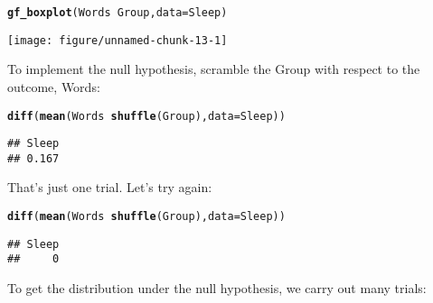 \documentclass[11pt]{article}\usepackage[]{graphicx}\usepackage[]{color}
\makeatletter
\def\maxwidth{ %
  \ifdim\Gin@nat@width>\linewidth
    \linewidth
  \else
    \Gin@nat@width
  \fi
}
\newcommand{\hlopt}[1]{\textcolor[rgb]{0,0,0}{#1}}%
\newcommand{\hlstd}[1]{\textcolor[rgb]{0.345,0.345,0.345}{#1}}%
\newcommand{\hlkwc}[1]{\textcolor[rgb]{0.333,0.667,0.333}{#1}}%
\newcommand{\hlkwd}[1]{\textcolor[rgb]{0.737,0.353,0.396}{\textbf{#1}}}%
\newenvironment{kframe}{%
 \def\at@end@of@kframe{}%
 \ifinner\ifhmode%
  \def\at@end@of@kframe{\end{minipage}}%
  \begin{minipage}{\columnwidth}%
 \fi\fi%
 \def\FrameCommand##1{\hskip\@totalleftmargin \hskip-\fboxsep
 \colorbox{shadecolor}{##1}\hskip-\fboxsep
     \hskip-\linewidth \hskip-\@totalleftmargin \hskip\columnwidth}%
 \MakeFramed {\advance\hsize-\width
   \@totalleftmargin\z@ \linewidth\hsize
   \@setminipage}}%
 {\par\unskip\endMakeFramed%
 \at@end@of@kframe}
\newenvironment{knitrout}{}{} %
\makeatother
\begin{document}
\begin{knitrout}
\color{fgcolor}\begin{kframe}
\begin{alltt}
\hlkwd{gf_boxplot}\hlstd{(Words} \hlopt{~} \hlstd{Group,} \hlkwc{data} \hlstd{= Sleep)}
\end{alltt}
\end{kframe}

{\centering \texttt{[image: figure/unnamed-chunk-13-1]} 

}



\end{knitrout}

To implement the null hypothesis, scramble the Group with respect to the
outcome, Words:
\begin{knitrout}
\color{fgcolor}\begin{kframe}
\begin{alltt}
\hlkwd{diff}\hlstd{(}\hlkwd{mean}\hlstd{(Words} \hlopt{~} \hlkwd{shuffle}\hlstd{(Group),} \hlkwc{data} \hlstd{= Sleep))}
\end{alltt}
\begin{verbatim}
## Sleep 
## 0.167
\end{verbatim}
\end{kframe}
\end{knitrout}

That's just one trial.  Let's try again:
\begin{knitrout}
\color{fgcolor}\begin{kframe}
\begin{alltt}
\hlkwd{diff}\hlstd{(}\hlkwd{mean}\hlstd{(Words} \hlopt{~} \hlkwd{shuffle}\hlstd{(Group),} \hlkwc{data} \hlstd{= Sleep))}
\end{alltt}
\begin{verbatim}
## Sleep 
##     0
\end{verbatim}
\end{kframe}
\end{knitrout}
To get the distribution under the null
hypothesis, we carry out many trials:
\end{document}
